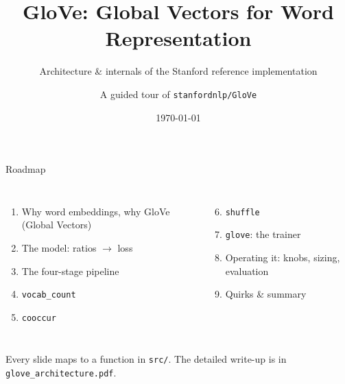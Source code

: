 \documentclass[aspectratio=169,11pt]{beamer}
\title{GloVe: Global Vectors for Word Representation}
\subtitle{Architecture \& internals of the Stanford reference implementation}
\author{A guided tour of \texttt{stanfordnlp/GloVe}}
\date{\today}
\newcommand{\file}[1]{\texttt{#1}}
\begin{document}
\maketitle

\begin{frame}{Roadmap}
\begin{columns}[T]
\begin{enumerate}
  \item Why word embeddings, why GloVe (Global Vectors)
  \item The model: ratios $\rightarrow$ loss
  \item The four-stage pipeline
  \item \texttt{vocab\_count}
  \item \texttt{cooccur}
\end{enumerate}
\begin{enumerate}\setcounter{enumi}{5}
  \item \texttt{shuffle}
  \item \texttt{glove}: the trainer
  \item Operating it: knobs, sizing, evaluation
  \item Quirks \& summary
\end{enumerate}
\end{columns}
\vfill
\small Every slide maps to a function in \file{src/}. The detailed write-up is in
\file{glove\_architecture.pdf}.
\end{frame}
\end{document}
